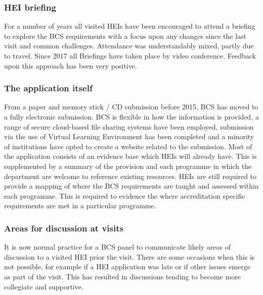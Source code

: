 \documentclass[sigconf]{acmart}
\begin{document}
\subsubsection{HEI briefing}
For a number of years all visited HEIs have been encouraged to attend a briefing to explore the BCS requirements with a focus upon any changes since the last visit and common challenges. %
Attendance was understandably mixed, partly due to travel. Since 2017 all Briefings have taken place by video conference. Feedback upon this approach has been very positive.

\subsubsection{The application itself}
From a paper and memory stick / CD submission before 2015, BCS has moved to a fully electronic submission. BCS is flexible in how the information is provided, a range of secure cloud-based file sharing systems have been employed, submission via the use of Virtual Learning Environment has been completed and a minority of institutions have opted to create a website related to the submission. Most of the application consists of an evidence base which HEIs will already have. This is supplemented by a summary of the provision and each programme in which the department are welcome to reference existing resources. HEIs are still required to provide a mapping of where the BCS requirements are taught and assessed within each programme. This is required to evidence the where accreditation specific requirements are met in a particular programme.

\subsubsection{Areas for discussion at visits}
It is now normal practice for a BCS panel to communicate likely areas of discussion to a visited HEI prior the visit. There are some occasions when this is not possible, for example if a HEI application was late or if other issues emerge as part of the visit.   This has resulted in discussions tending to become more collegiate and supportive. 
\begin{comment}
\subsection{Promoting the value of accreditation}
The value proposition discussed in this document is a definition of the value of accreditation from those who are intimately involved. BCS is in the process of initiating a conversation to explore the value proposition of accreditation from the point of view of other stakeholders.
\end{comment}
\end{document}
